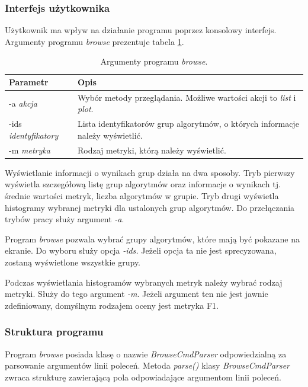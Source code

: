 \documentclass[../thesis.tex]{subfiles}
\begin{document}
\subsubsection{Interfejs użytkownika}

Użytkownik ma wpływ na działanie programu poprzez konsolowy interfejs. Argumenty programu \emph{browse} prezentuje tabela \ref{proj:table_browse_args}.

\begin{table}[h]
\begin{center}
\begin{tabular}{ | l | p{110mm} | }
\hline
\rowcolor{lightgray} Parametr & Opis \\\hline

-a \emph{akcja} & Wybór metody przeglądania. Możliwe wartości akcji to \emph{list} i \emph{plot}.\\\hline
-ids \emph{identyfikatory} & Lista identyfikatorów grup algorytmów, o których informacje należy wyświetlić.\\\hline
-m \emph{metryka} & Rodzaj metryki, którą należy wyświetlić.\\\hline

\end{tabular}
\caption{Argumenty programu \emph{browse}.}
\label{proj:table_browse_args}
\end{center}
\end{table}

Wyświetlanie informacji o wynikach grup działa na dwa sposoby. Tryb pierwszy wyświetla szczegółową listę grup algorytmów oraz informacje o wynikach tj. średnie wartości metryk, liczba algorytmów w grupie. Tryb drugi wyświetla histogramy wybranej metryki dla ustalonych grup algorytmów. Do przełączania trybów pracy służy argument \emph{-a}.

Program \emph{browse} pozwala wybrać grupy algorytmów, które mają być pokazane na ekranie. Do wyboru służy opcja \emph{-ids.} Jeżeli opcja ta nie jest sprecyzowana, zostaną wyświetlone wszystkie grupy.

Podczas wyświetlania histogramów wybranych metryk należy wybrać rodzaj metryki. Służy do tego argument \emph{-m}. Jeżeli argument ten nie jest jawnie zdefiniowany, domyślnym rodzajem oceny jest metryka F1.

\subsubsection{Struktura programu}

Program \emph{browse} posiada klasę o nazwie \emph{BrowseCmdParser} odpowiedzialną za parsowanie argumentów linii poleceń. Metoda \emph{parse()} klasy \emph{BrowseCmdParser} zwraca strukturę zawierającą pola odpowiadające argumentom linii poleceń. 
\end{document}
